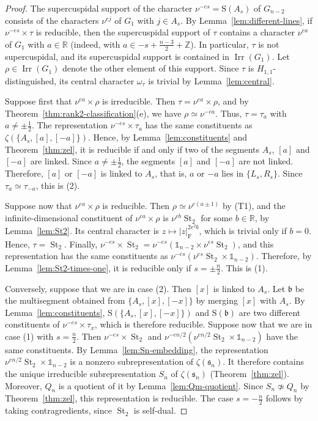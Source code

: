 \documentclass[11pt]{amsart}
\numberwithin{equation}{section}
\theoremstyle{plain}
\theoremstyle{definition}
\theoremstyle{remark}
\newcommand{\R}{\mathbb{R}}
\newcommand{\Z}{\mathbb{Z}}
\newcommand{\one}{\mathds{1}}
\DeclareMathOperator{\Irr}{Irr}
\DeclareMathOperator{\St}{St}
\newcommand{\bb}{\mathfrak{b}}
\newcommand{\sss}{\mathfrak{s}}
\newcommand{\Ss}{\mathrm{S}}
\begin{document}
\begin{proof}
	The supercuspidal support of the character $\nu^{-es}=\Ss(A_s)$ of $G_{n-2}$ consists of the characters $\nu^{ej}$ of $G_1$ with $j\in A_s$. By Lemma~\ref{lem:different-lines}, if $\nu^{-es}\times\tau$ is reducible, then the supercuspidal support of $\tau$ contains a character $\nu^{ea}$ of $G_1$ with $a\in\R$ (indeed, with $a\in-s+\frac{n-3}2+\Z$). In particular, $\tau$ is not supercuspidal, and its supercuspidal support is contained in $\Irr(G_1)$. Let $\rho\in\Irr(G_1)$ denote the other element of this support. Since $\tau$ is $H_{1,1}$-distinguished, its central character $\omega_\tau$ is trivial by Lemma~\ref{lem:central}.
	
	Suppose first that $\nu^{ea}\times\rho$ is irreducible. Then $\tau=\nu^{ea}\times\rho$, and by Theorem~\ref{thm:rank2-classification}(e), we have $\rho\simeq\nu^{-ea}$. Thus, $\tau=\tau_a$ with $a\ne\pm\frac12$. The representation $\nu^{-es}\times\tau_a$ has the same constituents as $\zeta(\{A_s,[a],[-a]\})$. Hence, by Lemma~\ref{lem:constituents} and Theorem~\ref{thm:zel}, it is reducible if and only if two of the segments $A_s$, $[a]$ and $[-a]$ are linked. Since $a\ne\pm\frac12$, the segments $[a]$ and $[-a]$ are not linked. Therefore, $[a]$ or $[-a]$ is linked to $A_s$, that is, $a$ or $-a$ lies in $\{L_s,R_s\}$. Since $\tau_a\simeq\tau_{-a}$, this is (2).
	
	Suppose now that $\nu^{ea}\times\rho$ is reducible. Then $\rho\simeq\nu^{e(a\pm1)}$ by (T1), and the infinite-dimensional constituent of $\nu^{ea}\times\rho$ is $\nu^{eb}\St_2$ for some $b\in\R$, by Lemma~\ref{lem:St2}. Its central character is $z\mapsto|z|_{\mathrm{F}}^{2e^2b}$, which is trivial only if $b=0$. Hence, $\tau=\St_2$. Finally, $\nu^{-es}\times\St_2=\nu^{-es}(\one_{n-2}\times\nu^{es}\St_2)$, and this representation has the same constituents as $\nu^{-es}(\nu^{es}\St_2\times\one_{n-2})$. Therefore, by Lemma~\ref{lem:St2-times-one}, it is reducible only if $s=\pm\frac n2$. This is (1).
	
	Conversely, suppose that we are in case (2). Then $[x]$ is linked to $A_s$. Let $\bb$ be the multisegment obtained from $\{A_s,[x],[-x]\}$ by merging $[x]$ with $A_s$. By Lemma~\ref{lem:constituents}, $\Ss(\{A_s,[x],[-x]\})$ and $\Ss(\bb)$ are two different constituents of $\nu^{-es}\times\tau_x$, which is therefore reducible. Suppose now that we are in case (1) with $s=\frac n2$. Then $\nu^{-es}\times\St_2$ and $\nu^{-en/2}(\nu^{en/2}\St_2\times\one_{n-2})$ have the same constituents. By Lemma~\ref{lem:Sn-embedding}, the representation $\nu^{en/2}\St_2\times\one_{n-2}$ is a nonzero subrepresentation of $\zeta(\sss_n)$. It therefore contains the unique irreducible subrepresentation $S_n$ of $\zeta(\sss_n)$ (Theorem~\ref{thm:zel}). Moreover, $Q_n$ is a quotient of it by Lemma~\ref{lem:Qm-quotient}. Since $S_n\not\simeq Q_n$ by Theorem~\ref{thm:zel}, this representation is reducible. The case $s=-\frac n2$ follows by taking contragredients, since $\St_2$ is self-dual.
\end{proof}
\end{document}

